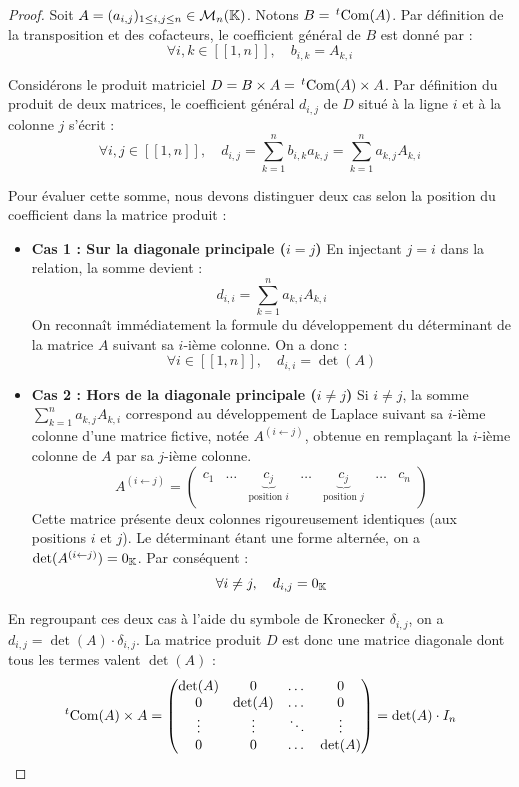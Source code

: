 \documentclass[12pt, a4paper]{report}
\begin{document}
\begin{proof}
    Soit $A = (a_{i,j})_{1 \le i,j \le n} \in \mathcal{M}_n(\mathbb{K})$. Notons $B = \,^t\mathrm{Com}(A)$. Par définition de la transposition et des cofacteurs, le coefficient général de $B$ est donné par :
    $$\forall i,k \in [\![1,n]\!], \quad b_{i,k} = A_{k,i}$$

    Considérons le produit matriciel $D = B \times A = \,^t\mathrm{Com}(A) \times A$. Par définition du produit de deux matrices, le coefficient général $d_{i,j}$ de $D$ situé à la ligne $i$ et à la colonne $j$ s'écrit :
    $$\forall i,j \in [\![1,n]\!], \quad d_{i,j} = \sum_{k=1}^n b_{i,k} a_{k,j} = \sum_{k=1}^n a_{k,j} A_{k,i}$$

    Pour évaluer cette somme, nous devons distinguer deux cas selon la position du coefficient dans la matrice produit :

    \begin{itemize}
        \item \textbf{Cas 1 : Sur la diagonale principale ($i = j$)}
        En injectant $j = i$ dans la relation, la somme devient :
        $$d_{i,i} = \sum_{k=1}^n a_{k,i} A_{k,i}$$
        On reconnaît immédiatement la formule du développement du déterminant de la matrice $A$ suivant sa $i$-ième colonne. On a donc :
        $$\forall i \in [\![1,n]\!], \quad d_{i,i} = \det(A)$$

        \item \textbf{Cas 2 : Hors de la diagonale principale ($i \neq j$)}
        Si $i \neq j$, la somme $\sum_{k=1}^n a_{k,j} A_{k,i}$ correspond au développement de Laplace suivant sa $i$-ième colonne d'une matrice fictive, notée $A^{(i \leftarrow j)}$, obtenue en remplaçant la $i$-ième colonne de $A$ par sa $j$-ième colonne.
        $$A^{(i \leftarrow j)} = \begin{pmatrix} c_1 & \dots & \underbrace{c_j}_{\text{position } i} & \dots & \underbrace{c_j}_{\text{position } j} & \dots & c_n \end{pmatrix}$$
        Cette matrice présente deux colonnes rigoureusement identiques (aux positions $i$ et $j$). Le déterminant étant une forme alternée, on a $\det(A^{(i \leftarrow j)}) = 0_{\mathbb{K}}$. Par conséquent :
        $$\forall i \neq j, \quad d_{i,j} = 0_{\mathbb{K}}$$
    \end{itemize}

    En regroupant ces deux cas à l'aide du symbole de Kronecker $\delta_{i,j}$, on a $d_{i,j} = \det(A) \cdot \delta_{i,j}$. La matrice produit $D$ est donc une matrice diagonale dont tous les termes valent $\det(A)$ :
    $$\,^t\mathrm{Com}(A) \times A = \begin{pmatrix} \det(A) & 0 & \dots & 0 \\ 0 & \det(A) & \dots & 0 \\ \vdots & \vdots & \ddots & \vdots \\ 0 & 0 & \dots & \det(A) \end{pmatrix} = \det(A) \cdot I_n$$


\end{proof}
\end{document}
